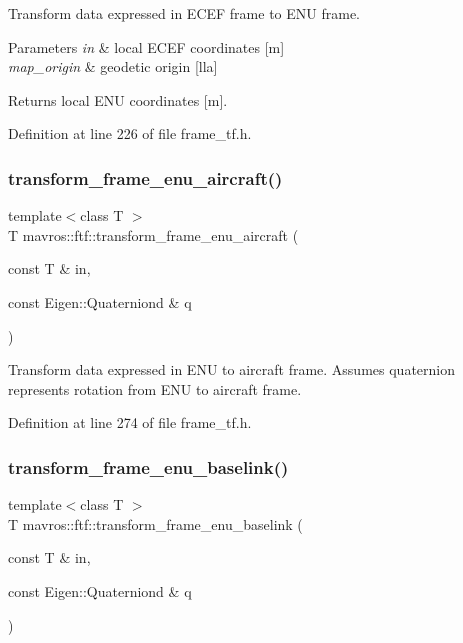 Transform data expressed in E\+C\+EF frame to E\+NU frame. 


\begin{DoxyParams}{Parameters}
{\em in} & local E\+C\+EF coordinates \mbox{[}m\mbox{]} \\
\hline
{\em map\+\_\+origin} & geodetic origin \mbox{[}lla\mbox{]} \\
\hline
\end{DoxyParams}
\begin{DoxyReturn}{Returns}
local E\+NU coordinates \mbox{[}m\mbox{]}. 
\end{DoxyReturn}


Definition at line 226 of file frame\+\_\+tf.\+h.

\mbox{\label{group__nodelib_ga669df732714ea8b69f228efba9f05dbb}} 
\subsubsection{\texorpdfstring{transform\_frame\_enu\_aircraft()}{transform\_frame\_enu\_aircraft()}}
{\footnotesize\ttfamily template$<$class T $>$ \\
T mavros\+::ftf\+::transform\+\_\+frame\+\_\+enu\+\_\+aircraft (\begin{DoxyParamCaption}\item[{const T \&}]{in,  }\item[{const Eigen\+::\+Quaterniond \&}]{q }\end{DoxyParamCaption})\hspace{0.3cm}{\ttfamily [inline]}}



Transform data expressed in E\+NU to aircraft frame. Assumes quaternion represents rotation from E\+NU to aircraft frame. 



Definition at line 274 of file frame\+\_\+tf.\+h.

\mbox{\label{group__nodelib_ga2f2546cf431334a76e19fdd3800f286d}} 
\subsubsection{\texorpdfstring{transform\_frame\_enu\_baselink()}{transform\_frame\_enu\_baselink()}}
{\footnotesize\ttfamily template$<$class T $>$ \\
T mavros\+::ftf\+::transform\+\_\+frame\+\_\+enu\+\_\+baselink (\begin{DoxyParamCaption}\item[{const T \&}]{in,  }\item[{const Eigen\+::\+Quaterniond \&}]{q }\end{DoxyParamCaption})\hspace{0.3cm}{\ttfamily [inline]}}



